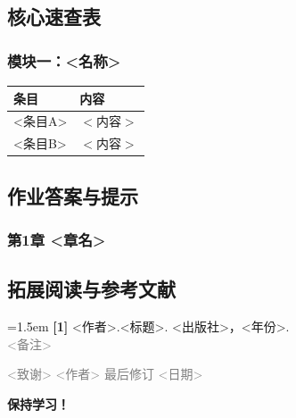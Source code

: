 \documentclass[10pt,a4paper]{article}
\begin{document}
\subsection{核心速查表}

\subsubsection*{模块一：<名称>}

\begin{center}
{\footnotesize
\begin{tabular}{@{}ll@{}}
\toprule
\textbf{条目} & \textbf{内容} \\
\midrule
<条目A> & $\displaystyle <内容>$ \\
<条目B> & $\displaystyle <内容>$ \\
\bottomrule
\end{tabular}
}
\end{center}

\vspace{0.5em}

\subsection{作业答案与提示}

\subsubsection*{第1章 <章名>} \label{ans:ch1}

\subsection*{拓展阅读与参考文献}

\vspace{0.2em}
\noindent
\hangindent=1.5em
\textbf{[1]} <作者>.<标题>. <出版社>，<年份>. \\
\hspace*{1.5em}\textcolor{gray}{\small <备注>}

\vspace{0.5em}
\noindent\textcolor{gray}{\small <致谢> \quad <作者> \quad 最后修订 <日期>}

\vspace{1em}
\begin{center}
  {\Huge\bfseries\color{titlecolor} \textemdash\textemdash 保持学习！\textemdash\textemdash}
\end{center}
\end{document}
